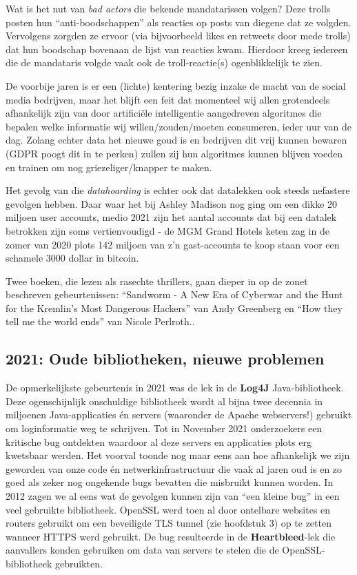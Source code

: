 \documentclass[
  10pt,
  dutch,
  paper=a4,
  ,captions=tableheading
]{scrbook}
\begin{document}
\begin{noteblock}
Wat is het nut van \emph{bad actors} die bekende mandatarissen volgen?
Deze trolls posten hun ``anti-boodschappen'' als reacties op posts van
diegene dat ze volgden. Vervolgens zorgden ze ervoor (via bijvoorbeeld
likes en retweets door mede trolls) dat hun boodschap bovenaan de lijst
van reacties kwam. Hierdoor kreeg iedereen die de mandataris volgde vaak
ook de troll-reactie(s) ogenblikkelijk te zien.
\end{noteblock}

De voorbije jaren is er een (lichte) kentering bezig inzake de macht van
de social media bedrijven, maar het blijft een feit dat momenteel wij
allen grotendeels afhankelijk zijn van door artificiële intelligentie
aangedreven algoritmes die bepalen welke informatie wij
willen/zouden/moeten consumeren, ieder uur van de dag. Zolang echter
data het nieuwe goud is en bedrijven dit vrij kunnen bewaren (GDPR poogt
dit in te perken) zullen zij hun algoritmes kunnen blijven voeden en
trainen om nog griezeliger/knapper te maken.

Het gevolg van die \emph{datahoarding} is echter ook dat datalekken ook
steeds nefastere gevolgen hebben. Daar waar het bij Ashley Madison nog
ging om een dikke 20 miljoen user accounts, medio 2021 zijn het aantal
accounts dat bij een datalek betrokken zijn soms vertienvoudigd - de MGM
Grand Hotels keten zag in de zomer van 2020 plots 142 miljoen van z'n
gast-accounts te koop staan voor een schamele 3000 dollar in bitcoin.

\begin{tipblock}
Twee boeken, die lezen als rasechte thrillers, gaan dieper in op de
zonet beschreven gebeurtenissen: ``Sandworm - A New Era of Cyberwar and
the Hunt for the Kremlin's Most Dangerous Hackers'' van Andy Greenberg
en ``How they tell me the world ends'' van Nicole Perlroth..
\end{tipblock}

\subsection{2021: Oude bibliotheken, nieuwe
problemen}\label{oude-bibliotheken-nieuwe-problemen}

De opmerkelijkste gebeurtenis in 2021 was de lek in de \textbf{Log4J}
Java-bibliotheek. Deze ogenschijnlijk onschuldige bibliotheek wordt al
bijna twee decennia in miljoenen Java-applicaties én servers (waaronder
de Apache webservers!) gebruikt om loginformatie weg te schrijven. Tot
in November 2021 onderzoekers een kritische bug ontdekten waardoor al
deze servers en applicaties plots erg kwetsbaar werden. Het voorval
toonde nog maar eens aan hoe afhankelijk we zijn geworden van onze code
én netwerkinfrastructuur die vaak al jaren oud is en zo goed als zeker
nog ongekende bugs bevatten die misbruikt kunnen worden. In 2012 zagen
we al eens wat de gevolgen kunnen zijn van ``een kleine bug'' in een
veel gebruikte bibliotheek. OpenSSL werd toen al door ontelbare websites
en routers gebruikt om een beveiligde TLS tunnel (zie hoofdstuk 3) op te
zetten wanneer HTTPS werd gebruikt. De bug resulteerde in de
\textbf{Heartbleed}-lek die aanvallers konden gebruiken om data van
servers te stelen die de OpenSSL-bibliotheek gebruikten.
\end{document}
